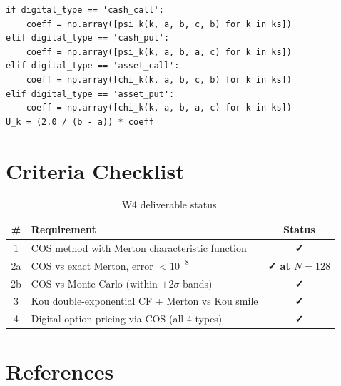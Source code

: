 \documentclass[12pt, a4paper]{article}
\theoremstyle{definition}
\begin{document}
\begin{lstlisting}[caption={Digital option COS payoff coefficients},label={lst:dig}]
if digital_type == 'cash_call':
    coeff = np.array([psi_k(k, a, b, c, b) for k in ks])
elif digital_type == 'cash_put':
    coeff = np.array([psi_k(k, a, b, a, c) for k in ks])
elif digital_type == 'asset_call':
    coeff = np.array([chi_k(k, a, b, c, b) for k in ks])
elif digital_type == 'asset_put':
    coeff = np.array([chi_k(k, a, b, a, c) for k in ks])
U_k = (2.0 / (b - a)) * coeff
\end{lstlisting}

\section{Criteria Checklist}

\begin{table}[H]
  \centering
  \caption{W4 deliverable status.}
  \begin{tabular}{clc}
    \toprule
    \textbf{\#} & \textbf{Requirement} & \textbf{Status}\\
    \midrule
    1 & COS method with Merton characteristic function
      & \textcolor{critgreen}{\textbf{✓}}\\
    2a & COS vs exact Merton, error $<10^{-8}$
      & \textcolor{critgreen}{\textbf{✓ at $N=128$}}\\
    2b & COS vs Monte Carlo (within $\pm2\sigma$ bands)
      & \textcolor{critgreen}{\textbf{✓}}\\
    3 & Kou double-exponential CF + Merton vs Kou smile
      & \textcolor{critgreen}{\textbf{✓}}\\
    4 & Digital option pricing via COS (all 4 types)
      & \textcolor{critgreen}{\textbf{✓}}\\
    \bottomrule
  \end{tabular}
\end{table}

\section*{References}
\end{document}
